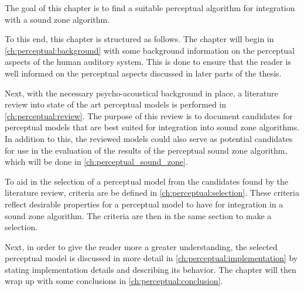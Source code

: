 The goal of this chapter is to find a suitable perceptual algorithm for integration with a sound zone algorithm.

To this end, this chapter is structured as follows.
The chapter will begin in \autoref{ch:perceptual:background} with some background information on the perceptual aspects of
the human auditory system.
This is done to ensure that the reader is well informed on the perceptual aspects discussed in later parts of the thesis.

Next, with the necessary psycho-acoustical background in place, a literature review into state of the art perceptual models
is performed in \autoref{ch:perceptual:review}.
The purpose of this review is to document candidates for perceptual models that are best suited for integration into 
sound zone algorithms.
In addition to this, the reviewed models could also serve as potential candidates for use in the evaluation of the 
results of the perceptual sound zone algorithm, which will be done in \autoref{ch:perceptual_sound_zone}.

To aid in the selection of a perceptual model from the candidates found by the literature review, criteria are be defined
in \autoref{ch:perceptual:selection}. 
These criteria reflect desirable properties for a perceptual model to have for integration in a sound zone algorithm.
The criteria are then in the same section to make a selection.

Next, in order to give the reader more a greater understanding, the selected perceptual model is discussed in more detail in
\autoref{ch:perceptual:implementation} by stating implementation details and describing its behavior.
The chapter will then wrap up with some conclusions in \autoref{ch:perceptual:conclusion}.
